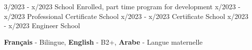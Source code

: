 \documentclass[9pt]{developercv} %
\begin{document}
\vspace{-10 pt}
\begin{entrylist}
    \entry
		{3/2023 - x/2023}
		{\lipsum[1][1] }
		{School}
		{Enrolled, part time program for development}
    \entry
		{x/2023 - x/2023}
		{Professional Certificate}
		{School}
		{\lipsum[1][1]}
	\entry
		{x/2023 - x/2023}
		{Certificate}
		{School}
		{\lipsum[1][2]}
	\entry
		{x/2023 - x/2023}
		{Engineer}
		{School}
		{\lipsum[1][2]}
\end{entrylist}
\vspace{-10 pt}
    \vspace{-6pt}
    
    \hspace{26mm} \textbf{Français} - Bilingue,\hspace{5mm} \textbf{English} - B2+,\hspace{5mm} \textbf{ Arabe} - Langue maternelle

\end{document}
